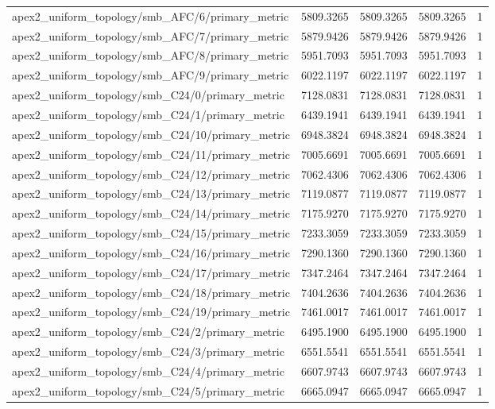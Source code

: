 \begin{table}[h]
\begin{tabular}{lrrrr}
apex2_uniform_topology/smb_AFC/6/primary_metric & 5809.3265 & 5809.3265 & 5809.3265 & 1 \\
apex2_uniform_topology/smb_AFC/7/primary_metric & 5879.9426 & 5879.9426 & 5879.9426 & 1 \\
apex2_uniform_topology/smb_AFC/8/primary_metric & 5951.7093 & 5951.7093 & 5951.7093 & 1 \\
apex2_uniform_topology/smb_AFC/9/primary_metric & 6022.1197 & 6022.1197 & 6022.1197 & 1 \\
apex2_uniform_topology/smb_C24/0/primary_metric & 7128.0831 & 7128.0831 & 7128.0831 & 1 \\
apex2_uniform_topology/smb_C24/1/primary_metric & 6439.1941 & 6439.1941 & 6439.1941 & 1 \\
apex2_uniform_topology/smb_C24/10/primary_metric & 6948.3824 & 6948.3824 & 6948.3824 & 1 \\
apex2_uniform_topology/smb_C24/11/primary_metric & 7005.6691 & 7005.6691 & 7005.6691 & 1 \\
apex2_uniform_topology/smb_C24/12/primary_metric & 7062.4306 & 7062.4306 & 7062.4306 & 1 \\
apex2_uniform_topology/smb_C24/13/primary_metric & 7119.0877 & 7119.0877 & 7119.0877 & 1 \\
apex2_uniform_topology/smb_C24/14/primary_metric & 7175.9270 & 7175.9270 & 7175.9270 & 1 \\
apex2_uniform_topology/smb_C24/15/primary_metric & 7233.3059 & 7233.3059 & 7233.3059 & 1 \\
apex2_uniform_topology/smb_C24/16/primary_metric & 7290.1360 & 7290.1360 & 7290.1360 & 1 \\
apex2_uniform_topology/smb_C24/17/primary_metric & 7347.2464 & 7347.2464 & 7347.2464 & 1 \\
apex2_uniform_topology/smb_C24/18/primary_metric & 7404.2636 & 7404.2636 & 7404.2636 & 1 \\
apex2_uniform_topology/smb_C24/19/primary_metric & 7461.0017 & 7461.0017 & 7461.0017 & 1 \\
apex2_uniform_topology/smb_C24/2/primary_metric & 6495.1900 & 6495.1900 & 6495.1900 & 1 \\
apex2_uniform_topology/smb_C24/3/primary_metric & 6551.5541 & 6551.5541 & 6551.5541 & 1 \\
apex2_uniform_topology/smb_C24/4/primary_metric & 6607.9743 & 6607.9743 & 6607.9743 & 1 \\
apex2_uniform_topology/smb_C24/5/primary_metric & 6665.0947 & 6665.0947 & 6665.0947 & 1 \\

\end{tabular}
\end{table}
